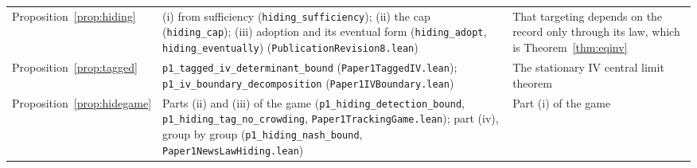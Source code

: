 \begin{longtable}{>{\raggedright\arraybackslash}p{}>{\raggedright\arraybackslash}p{}>{\raggedright\arraybackslash}p{}}
Proposition~\ref{prop:hiding} & (i) from sufficiency (\texttt{hiding\_sufficiency}); (ii) the cap (\texttt{hiding\_cap}); (iii) adoption and its eventual form (\texttt{hiding\_adopt}, \texttt{hiding\_eventually}) (\nolinkurl{PublicationRevision8.lean}) & That targeting depends on the record only through its law, which is Theorem~\ref{thm:eqinv}\\
Proposition~\ref{prop:tagged} & \texttt{p1\_tagged\_iv\_determinant\_bound} (\nolinkurl{Paper1TaggedIV.lean}); \texttt{p1\_iv\_boundary\_decomposition} (\nolinkurl{Paper1IVBoundary.lean}) & The stationary IV central limit theorem\\
Proposition~\ref{prop:hidegame} & Parts (ii) and (iii) of the game (\texttt{p1\_hiding\_detection\_bound}, \texttt{p1\_hiding\_tag\_no\_crowding}, \nolinkurl{Paper1TrackingGame.lean}); part (iv), group by group (\texttt{p1\_hiding\_nash\_bound}, \nolinkurl{Paper1NewsLawHiding.lean}) & Part (i) of the game\\


\end{longtable}
